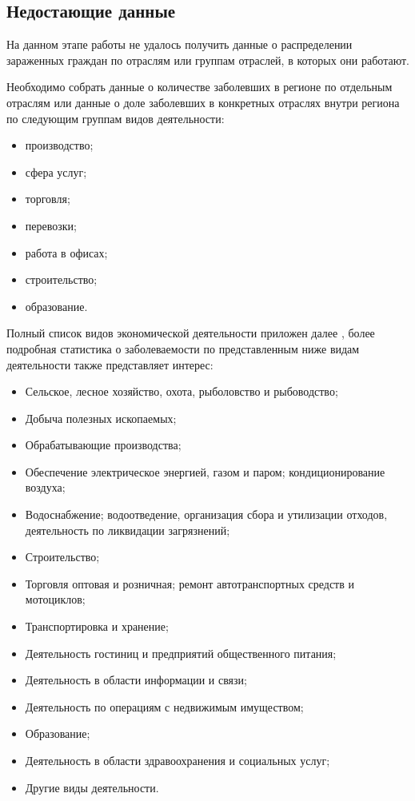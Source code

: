 \documentclass[12pt, a4paper]{article}
\begin{document}
\subsection{Недостающие данные}
На данном этапе работы не удалось получить данные о распределении зараженных граждан по отраслям или группам отраслей, в которых они работают.

Необходимо собрать данные о количестве заболевших в регионе по отдельным отраслям или данные о доле заболевших в конкретных отраслях внутри региона по следующим группам видов деятельности: 
\begin{itemize}
\item производство;
\item сфера услуг;
\item торговля;
\item перевозки;
\item работа в офисах;
\item строительство;
\item образование.
\end{itemize}

Полный список видов экономической деятельности приложен далее \cite{Region_stat}, более подробная статистика о заболеваемости по представленным ниже видам деятельности также представляет интерес:
\begin{itemize}
\item Сельское, лесное хозяйство, охота, рыболовство и рыбоводство;
\item Добыча полезных ископаемых;
\item Обрабатывающие производства;
\item Обеспечение электрическое энергией, газом и паром; кондиционирование воздуха;
\item Водоснабжение; водоотведение, организация сбора и утилизации отходов, деятельность по ликвидации загрязнений;
\item Строительство;
\item Торговля оптовая и розничная; ремонт автотранспортных средств и мотоциклов;
\item Транспортировка и хранение;
\item Деятельность гостиниц и предприятий общественного питания;
\item Деятельность в области информации и связи;
\item Деятельность по операциям с недвижимым имуществом;
\item Образование;
\item Деятельность в области здравоохранения и социальных услуг;
\item Другие виды деятельности.
\end{itemize}
\end{document}
